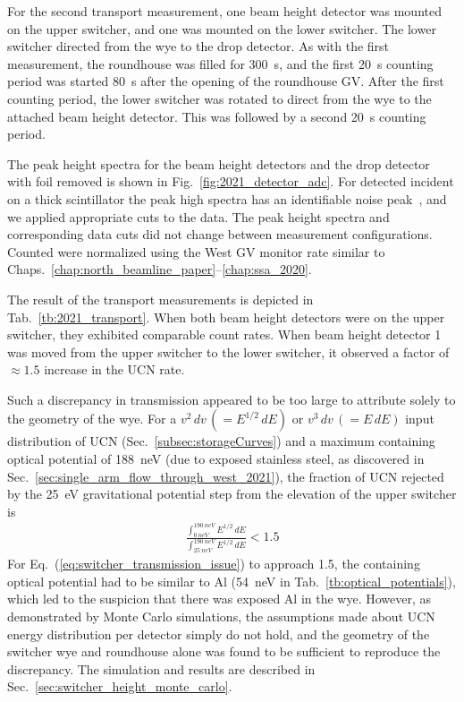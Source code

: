 For the second \ucn transport measurement, one beam height detector was mounted on the upper switcher, and one was mounted on the lower switcher. The lower switcher directed \ucn from the wye to the drop detector. As with the first measurement, the roundhouse was filled for \qty{300}{s}, and the first \qty{20}{s} counting period was started \qty{80}{s} after the opening of the roundhouse GV. After the first counting period, the lower switcher was rotated to direct \ucn from the wye to the attached beam height detector. This was followed by a second \qty{20}{s} counting period.

The peak height spectra for the beam height detectors and the drop detector with foil removed is shown in Fig.~\ref{fig:2021_detector_adc}. For detected \ucn incident on a thick \BZnS scintillator the peak high spectra has an identifiable noise peak~\cite{jeph_multilayer_2015}, and we applied appropriate cuts to the data. The peak height spectra and corresponding data cuts did not change between measurement configurations. Counted \ucn were normalized using the West GV monitor rate similar to Chaps.~\ref{chap:north_beamline_paper}--\ref{chap:ssa_2020}. 

The result of the transport measurements is depicted in Tab.~\ref{tb:2021_transport}. When both beam height detectors were on the upper switcher, they exhibited comparable count rates. When beam height detector 1 was moved from the upper switcher to the lower switcher, it observed a factor of $\approx 1.5$ increase in the UCN rate. 

Such a discrepancy in transmission appeared to be too large to attribute solely to the geometry of the wye. For a $v^2\,dv\,(=E^{1/2}\,dE)$ or $v^3\,dv\,(=E\,dE)$ input distribution of UCN (Sec.~\ref{subsec:storageCurves}) and a maximum containing optical potential of \qty{188}{\nano\eV} (due to exposed stainless steel, as discovered in Sec.~\ref{sec:single_arm_flow_through_west_2021}), the fraction of UCN rejected by the \qty{25}{\eV} gravitational potential step from the elevation of the upper switcher is
%
\begin{gather}
    \frac{\int_{\qty{0}{neV}}^{\qty{190}{neV}}E^{1/2}\,dE}{\int_{\qty{25}{neV}}^{\qty{190}{neV}}E^{1/2}\,dE} < 1.5 \label{eq:switcher_transmission_issue}
\end{gather}
%
For Eq.~(\ref{eq:switcher_transmission_issue}) to approach 1.5, the containing optical potential had to be similar to Al (\qty{54}{\nano\eV} in Tab.~\ref{tb:optical_potentials}), which led to the suspicion that there was exposed Al in the wye. However, as demonstrated by Monte Carlo simulations, the assumptions made about UCN energy distribution per detector simply do not hold, and the geometry of the switcher wye and roundhouse alone was found to be sufficient to reproduce the discrepancy. The simulation and results are described in Sec.~\ref{sec:switcher_height_monte_carlo}.

